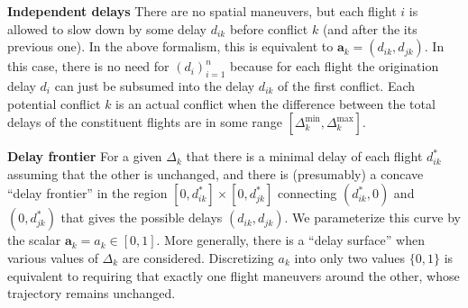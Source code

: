 \documentclass{article}
\begin{document}
\noindent 
\textbf{Independent delays}
There are no spatial maneuvers, but each flight $i$ is allowed to slow down by some delay $d_{ik}$ before conflict $k$ (and after the its previous one).
In the above formalism, this is equivalent to $\mathbf a_k = (d_{ik}, d_{jk})$.
In this case, there is no need for $\left(d_i\right)_{i=1}^n$ because for each flight the origination delay $d_i$ can just be subsumed into the delay $d_{ik}$ of the first conflict.
Each potential conflict $k$ is an actual conflict when the difference between the total delays of the constituent flights are in some range $\left[\Delta_k^{\mathrm{min}}, \Delta_k^{\mathrm{max}}\right]$.

\noindent 
\textbf{Delay frontier}
For a given $\Delta_{k}$ that there is a minimal delay of each flight $d_{ik}^*$ assuming that the other is unchanged, and there is (presumably) a concave ``delay frontier'' in the region $[0, d_{ik}^*] \times [0, d_{jk}^*]$ connecting $(d_{ik}^*, 0)$ and $(0, d_{jk}^*)$ that gives the possible delays $(d_{ik}, d_{jk})$. 
We parameterize this curve by the scalar $\mathbf a_k = a_{k} \in [0, 1]$.
More generally, there is a ``delay surface'' when various values of $\Delta_{k}$ are considered.
Discretizing $a_k$ into only two values $\{0, 1\}$ is equivalent to requiring that exactly one flight maneuvers around the other, whose trajectory remains unchanged.
\end{document}
